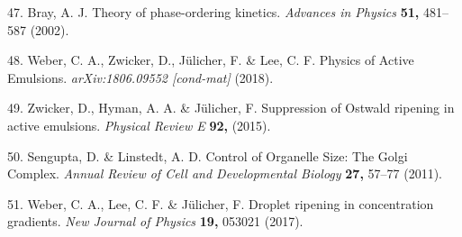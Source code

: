\documentclass{Dissertate}
\begin{document}
\leavevmode\hypertarget{ref-bray_theory_2002}{}%
47. Bray, A. J. Theory of phase-ordering kinetics. \emph{Advances in
Physics} \textbf{51,} 481--587 (2002).

\leavevmode\hypertarget{ref-weber_physics_2018}{}%
48. Weber, C. A., Zwicker, D., Jülicher, F. \& Lee, C. F. Physics of
Active Emulsions. \emph{arXiv:1806.09552 {[}cond-mat{]}} (2018).

\leavevmode\hypertarget{ref-zwicker_suppression_2015}{}%
49. Zwicker, D., Hyman, A. A. \& Jülicher, F. Suppression of Ostwald
ripening in active emulsions. \emph{Physical Review E} \textbf{92,}
(2015).

\leavevmode\hypertarget{ref-sengupta_control_2011}{}%
50. Sengupta, D. \& Linstedt, A. D. Control of Organelle Size: The Golgi
Complex. \emph{Annual Review of Cell and Developmental Biology}
\textbf{27,} 57--77 (2011).

\leavevmode\hypertarget{ref-weber_droplet_2017}{}%
51. Weber, C. A., Lee, C. F. \& Jülicher, F. Droplet ripening in
concentration gradients. \emph{New Journal of Physics} \textbf{19,}
053021 (2017).
\end{document}
